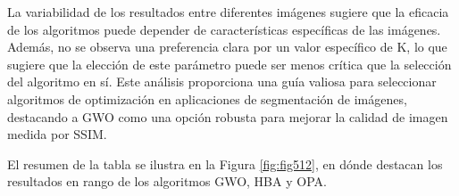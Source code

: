 \documentclass[conference]{IEEEtran}
\begin{document}
\noindent La variabilidad de los resultados entre diferentes imágenes sugiere que la eficacia de los algoritmos puede depender de características específicas de las imágenes. Además, no se observa una preferencia clara por un valor específico de K, lo que sugiere que la elección de este parámetro puede ser menos crítica que la selección del algoritmo en sí. Este análisis proporciona una guía valiosa para seleccionar algoritmos de optimización en aplicaciones de segmentación de imágenes, destacando a GWO como una opción robusta para mejorar la calidad de imagen medida por SSIM.

\noindent El resumen de la tabla se ilustra en la Figura \ref{fig:fig512}, en dónde destacan los resultados en rango de los algoritmos GWO, HBA y OPA.
\end{document}
